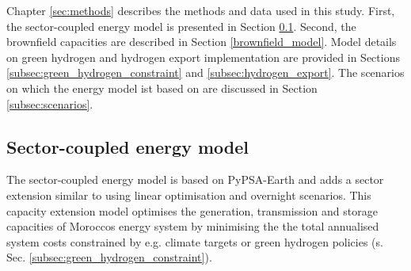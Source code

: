 Chapter \ref{sec:methods} describes the methods and data used in this study. First, the sector-coupled energy model is presented in Section \ref{subsec:moroccan_model}. Second, the brownfield capacities are described in Section \ref{brownfield_model}. Model details on green hydrogen and hydrogen export implementation are provided in Sections \ref{subsec:green_hydrogen_constraint} and \ref{subsec:hydrogen_export}. The scenarios on which the energy model ist based on are discussed in Section \ref{subsec:scenarios}.


\subsection{Sector-coupled energy model}
\label{subsec:moroccan_model}
The sector-coupled energy model is based on PyPSA-Earth \cite{Parzen2023} and adds a sector extension similar to \cite{Brown2018a} using linear optimisation and overnight scenarios. This capacity extension model optimises the generation, transmission and storage capacities of Moroccos energy system by minimising the the total annualised system costs constrained by e.g. climate targets or green hydrogen policies (s. Sec. \ref{subsec:green_hydrogen_constraint}).

